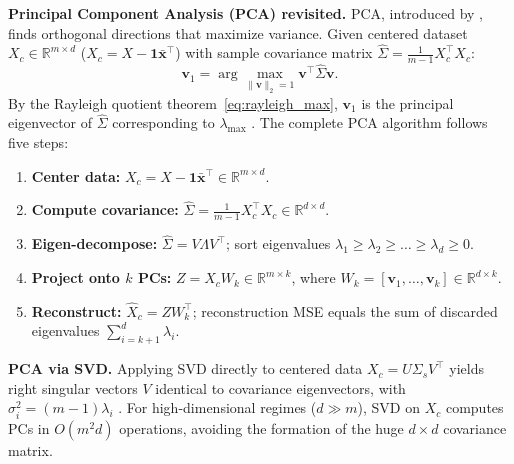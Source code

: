 \documentclass[11pt,a4paper]{article}
\begin{document}
	\begin{practicebox}

	\end{practicebox}

	\textbf{Principal Component Analysis (PCA) revisited.}
	PCA, introduced by \textcite{pearson1901}, finds orthogonal directions that maximize variance. Given centered dataset $X_c \in \mathbb{R}^{m \times d}$ ($X_c = X - \mathbf{1}\bar{\mathbf{x}}^\top$) with sample covariance matrix $\hat\Sigma = \frac{1}{m-1}X_c^\top X_c$:
	\begin{equation}
		\mathbf{v}_1 = \arg\max_{\|\mathbf{v}\|_2=1} \mathbf{v}^\top \hat\Sigma \mathbf{v}.
		\label{eq:pca_opt}
	\end{equation}
	By the Rayleigh quotient theorem~\eqref{eq:rayleigh_max}, $\mathbf{v}_1$ is the principal eigenvector of $\hat\Sigma$ corresponding to $\lambda_{\max}$ \parencite{strang2012linear, bishop2006}. The complete PCA algorithm follows five steps:
	\begin{enumerate}[nosep]
		\item \textbf{Center data:} $X_c = X - \mathbf{1}\bar{\mathbf{x}}^\top \in \mathbb{R}^{m \times d}$.
		\item \textbf{Compute covariance:} $\hat\Sigma = \frac{1}{m-1}X_c^\top X_c \in \mathbb{R}^{d \times d}$.
		\item \textbf{Eigen-decompose:} $\hat\Sigma = V \Lambda V^\top$; sort eigenvalues $\lambda_1 \ge \lambda_2 \ge \dots \ge \lambda_d \ge 0$.
		\item \textbf{Project onto $k$ PCs:} $Z = X_c W_k \in \mathbb{R}^{m \times k}$, where $W_k = [\mathbf{v}_1, \dots, \mathbf{v}_k] \in \mathbb{R}^{d \times k}$.
		\item \textbf{Reconstruct:} $\hat X_c = Z W_k^\top$; reconstruction MSE equals the sum of discarded eigenvalues $\sum_{i=k+1}^d \lambda_i$.
	\end{enumerate}

	\textbf{PCA via SVD.}
	Applying SVD directly to centered data $X_c = U \Sigma_s V^\top$ yields right singular vectors $V$ identical to covariance eigenvectors, with $\sigma_i^2 = (m-1)\lambda_i$ \parencite{trefethen1997, strang2019}. For high-dimensional regimes ($d \gg m$), SVD on $X_c$ computes PCs in $O(m^2 d)$ operations, avoiding the formation of the huge $d \times d$ covariance matrix.

	\begin{practicebox}

	\end{practicebox}
\end{document}
